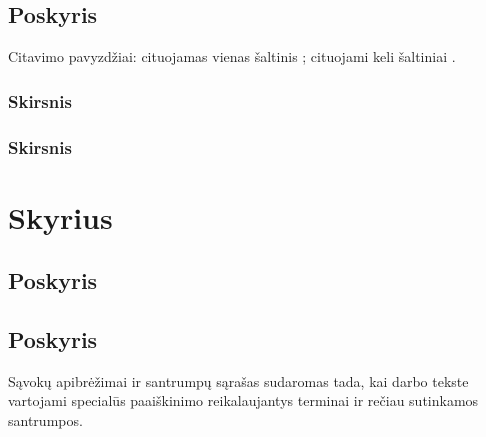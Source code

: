 \documentclass{VUMIFPSkursinis}
\begin{document}
\subsection{Poskyris}
Citavimo pavyzdžiai: cituojamas vienas šaltinis \cite{PvzStraipsnLt}; cituojami
keli šaltiniai \cite{PvzStraipsnEn, PvzKonfLt, PvzKonfEn, PvzKnygLt, PvzKnygEn,
PvzElPubLt, PvzElPubEn, PvzMagistrLt, PvzPhdEn, VulSkApieMusLt}.

\subsubsection{Skirsnis}
\subsubsection{Skirsnis}
\section{Skyrius}
\subsection{Poskyris}
\subsection{Poskyris}




\printbibliography[heading=bibintoc, title=Šaltiniai]  %

Sąvokų apibrėžimai ir santrumpų sąrašas sudaromas tada, kai darbo tekste
vartojami specialūs paaiškinimo reikalaujantys terminai ir rečiau sutinkamos
santrumpos.
\end{document}
